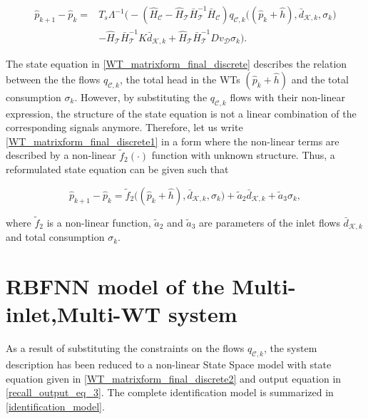 \vspace{-4mm}
\begin{align}
\label{WT_matrixform_final_discrete1}
\nonumber  \hat{p}_{k+1} - \hat{p}_k  =& T_s \Lambda^{-1} \big(- (\hat{H}_{\mathcal{C}} - \hat{H}_{\mathcal{T}} \bar{H}^{-1}_{\mathcal{T}}\bar{H}_{\mathcal{C}})  q_{\mathcal{C},k}\big ((\hat{p}_k + \hat{h}),\bar{d}_{\mathcal{K},k}, \sigma_k \big) \\ & - \hat{H}_{\mathcal{T}} \bar{H}^{-1}_{\mathcal{T}} K \bar{d}_{\mathcal{K},k} + \hat{H}_{\mathcal{T}} \bar{H}^{-1}_{\mathcal{T}} D v_{\mathcal{D}} \sigma_k \big).
\end{align}
\vspace{-4mm}


The state equation in \eqref{WT_matrixform_final_discrete} describes the relation between the the flows $q_{\mathcal{C},k}$, the total head in the WTs $(\hat{p}_k + \hat{h})$ and the total consumption $\sigma_k$. However, by substituting the $q_{\mathcal{C},k}$ flows with their non-linear expression, the structure of the state equation is not a linear combination of the corresponding signals anymore. Therefore, let us write \eqref{WT_matrixform_final_discrete1} in a form where the non-linear terms are described by a non-linear $\tilde{f}_2(\cdot)$ function with unknown structure. Thus, a reformulated state equation can be given such that

 \begin{equation}
  \label{WT_matrixform_final_discrete2}
     \hat{p}_{k+1} - \hat{p}_k = \tilde{f}_2 \big((\hat{p}_k + \hat{h}),\bar{d}_{\mathcal{K},k}, \sigma_k\big) + \tilde{a}_2 \bar{d}_{\mathcal{K},k} + \tilde{a}_3 \sigma_k,
\end{equation} 


where $\tilde{f}_2$ is a non-linear function, $\tilde{a}_2$ and $\tilde{a}_3$ are parameters of the inlet flows $\bar{d}_{\mathcal{K},k}$ and total consumption $\sigma_k$. 


\section{RBFNN model of the Multi-inlet,Multi-WT system}
\label{RBFNN_model_multi_inlet_multi_WT_sys} 

As a result of substituting the constraints on the flows $q_{\mathcal{C},k}$, the system description has been reduced to a non-linear State Space model with state equation given in \eqref {WT_matrixform_final_discrete2} and output equation in \eqref {recall_output_eq_3}. The complete identification model is summarized in \eqref{identification_model}. 

